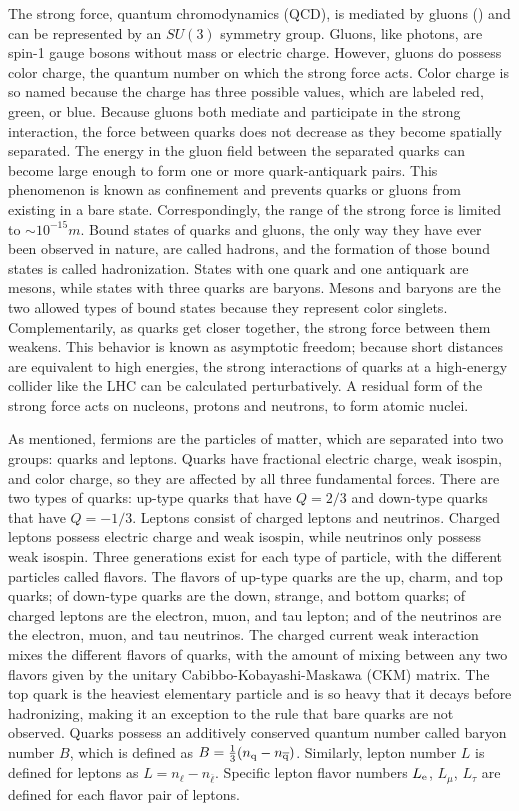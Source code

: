 The strong force, quantum chromodynamics (QCD), is mediated by gluons (\cPg) and can be represented by an $SU(3)$ symmetry group. Gluons, like photons, are spin-1 gauge bosons without mass or electric charge. However, gluons do possess color charge, the quantum number on which the strong force acts. Color charge is so named because the charge has three possible values, which are labeled red, green, or blue. Because gluons both mediate and participate in the strong interaction, the force between quarks does not decrease as they become spatially separated. The energy in the gluon field between the separated quarks can become large enough to form one or more quark-antiquark pairs. This phenomenon is known as confinement and prevents quarks or gluons from existing in a bare state. Correspondingly, the range of the strong force is limited to ${\sim} 10^{-15}\unit{m}$. Bound states of quarks and gluons, the only way they have ever been observed in nature, are called hadrons, and the formation of those bound states is called hadronization. States with one quark and one antiquark are mesons, while states with three quarks are baryons. Mesons and baryons are the two allowed types of bound states because they represent color singlets. Complementarily, as quarks get closer together, the strong force between them weakens. This behavior is known as asymptotic freedom; because short distances are equivalent to high energies, the strong interactions of quarks at a high-energy collider like the LHC can be calculated perturbatively. A residual form of the strong force acts on nucleons, protons and neutrons, to form atomic nuclei.

As mentioned, fermions are the particles of matter, which are separated into two groups: quarks and leptons. Quarks have fractional electric charge, weak isospin, and color charge, so they are affected by all three fundamental forces. There are two types of quarks: up-type quarks that have $Q = 2/3$ and down-type quarks that have $Q = -1/3$. Leptons consist of charged leptons and neutrinos. Charged leptons possess electric charge and weak isospin, while neutrinos only possess weak isospin. Three generations exist for each type of particle, with the different particles called flavors. The flavors of up-type quarks are the up, charm, and top quarks; of down-type quarks are the down, strange, and bottom quarks; of charged leptons are the electron, muon, and tau lepton; and of the neutrinos are the electron, muon, and tau neutrinos. The charged current weak interaction mixes the different flavors of quarks, with the amount of mixing between any two flavors given by the unitary Cabibbo-Kobayashi-Maskawa (CKM) matrix. The top quark is the heaviest elementary particle and is so heavy that it decays before hadronizing, making it an exception to the rule that bare quarks are not observed. Quarks possess an additively conserved quantum number called baryon number $B$, which is defined as $B = \frac{1}{3}(n_{\mathrm{q}} - n_{\overline{\mathrm{q}}})$. Similarly, lepton number $L$ is defined for leptons as $L = n_{\ell} - n_{\overline{\ell}}$. Specific lepton flavor numbers $L_{\mathrm{e}}$, $L_{\mu}$, $L_{\tau}$ are defined for each flavor pair of leptons.


